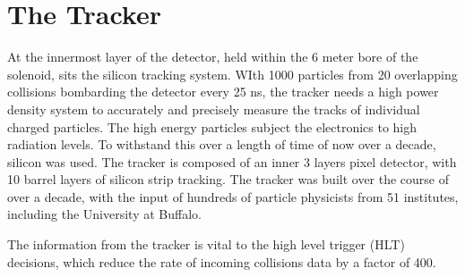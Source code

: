 \vspace{-3pt}
\section{The Tracker}\label{sec:ch3:trk}


At the innermost layer of the detector, held within the 6 meter bore of the solenoid, sits the silicon tracking system. WIth 1000 particles from 20 overlapping collisions bombarding the detector every 25 ns, the tracker needs a high power density system to accurately and precisely measure the tracks of individual charged particles. The high energy particles subject the electronics to high radiation levels. To withstand this over a length of time of now over a decade, silicon was used. The tracker is composed of an inner 3 layers pixel detector, with 10 barrel layers of silicon strip tracking. The tracker was built over the course of over a decade, with the input of hundreds of particle physicists from 51 institutes, including the University at Buffalo.

The information from the tracker is vital to the high level trigger (HLT) decisions, which reduce the rate of incoming collisions data by a factor of 400. 
